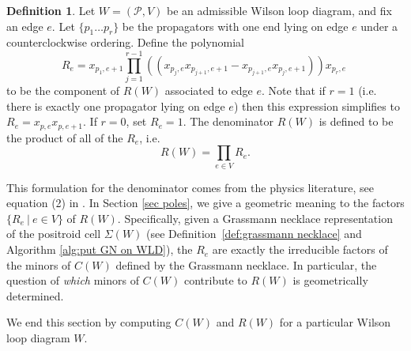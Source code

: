 \documentclass[11pt]{article}
\newcommand{\cP}{\mathcal{P}}
\theoremstyle{remark}
\theoremstyle{definition}
\newtheorem{dfn}[thm]{Definition}
\begin{document}
\begin{dfn}\label{def R(W)}
Let $W = (\cP,V)$ be an admissible Wilson loop diagram, and fix an edge $e$. Let $\{p_1 \ldots p_r\}$ be the propagators with one end lying on edge $e$ under a counterclockwise ordering. Define the polynomial
\[ R_e =  x_{p_1,e+1} \prod_{j= 1}^{r-1} \left((x_{p_j,e} x_{p_{j+1},e+1} - x_{p_{j+1},e} x_{p_{j},e+1} ) \right) x_{p_r,e}\;\]
to be the component of $R(W)$ associated to edge $e$. Note that if $r = 1$ (i.e. there is exactly one propagator lying on edge $e$) then this expression simplifies to $R_e = x_{p,e} x_{p,e+1}$. If $r=0$, set $R_e = 1$. The denominator $R(W)$ is defined to be the product of all of the $R_e$, i.e. 
\[R(W) = \prod_{e \in V} R_e.\]
\end{dfn}

This formulation for the denominator comes from the physics literature, see equation (2) in \cite{HeslopStewart}. In Section \ref{sec poles}, we give a geometric meaning to the factors $\{R_e\ |\ e \in V\}$ of $R(W)$.  Specifically, given a Grassmann necklace representation of the positroid cell $\Sigma(W)$ (see Definition~\ref{def:grassmann necklace} and Algorithm \ref{alg:put GN on WLD}), the $R_e$ are exactly the irreducible factors of the minors of $C(W)$ defined by the Grassmann necklace. In particular, the question of \emph{which} minors of $C(W)$ contribute to $R(W)$ is geometrically determined. 
 
We end this section by computing $C(W)$ and $R(W)$ for a particular Wilson loop diagram $W$.
\end{document}
